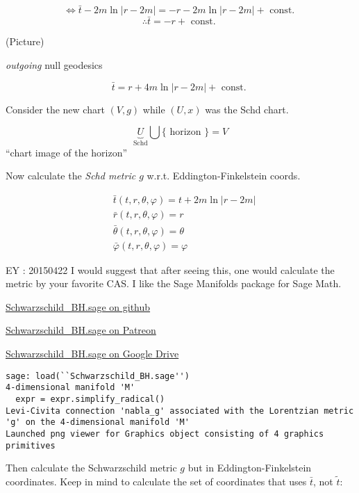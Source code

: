 \documentclass[10pt, twoside]{amsart}
\begin{document}
\begin{multicols*}{2}
\[
\Longleftrightarrow \bar{t} - 2m \ln{ |r-2m |} = -r - 2m \ln{ |r-2m |} + \text{ const. }
\]
\[
\therefore \bar{t} = -r + \text{ const. }
\]

(Picture)

\emph{outgoing} null geodesics

\[
\bar{t} = r + 4 m \ln{ |r - 2m| } + \text{ const. }
\]

Consider the new chart $(V,g)$ while $(U,x)$ was the Schd chart.

\[
\underbrace{U}_{\text{Schd}} \bigcup \lbrace \text{ horizon } \rbrace = V
\]
``chart image of the horizon''

Now calculate the \emph{Schd metric $g$ } w.r.t. Eddington-Finkelstein coords.

\[
\begin{aligned}
  & \bar{t}(t,r,\theta,\varphi) = t + 2m\ln{ |r -2m | } \\
  & \bar{r}(t,r,\theta,\varphi) = r \\
  & \bar{\theta}(t,r,\theta,\varphi) = \theta \\
  & \bar{\varphi}(t,r,\theta,\varphi) = \varphi
\end{aligned}
\]

EY : 20150422 I would suggest that after seeing this, one would calculate the metric by your favorite CAS.  I like the Sage Manifolds package for Sage Math.  

\href{https://github.com/ernestyalumni/diffgeo-by-sagemnfd/blob/master/Schwarzschild_BH.sage}{Schwarzschild\_BH.sage on github}

\href{https://www.patreon.com/file?s=645287&h=2254352&i=108637}{Schwarzschild\_BH.sage on Patreon}

\href{https://drive.google.com/file/d/0B1H1Ygkr4EWJdllTR3czQU9DeW8/view?usp=sharing}{Schwarzschild\_BH.sage on Google Drive}

\begin{lstlisting}[frame=single]
sage: load(``Schwarzschild_BH.sage'')
4-dimensional manifold 'M'
  expr = expr.simplify_radical()
Levi-Civita connection 'nabla_g' associated with the Lorentzian metric 'g' on the 4-dimensional manifold 'M'
Launched png viewer for Graphics object consisting of 4 graphics primitives
\end{lstlisting}

Then calculate the Schwarzschild metric $g$ but in Eddington-Finkelstein coordinates.  Keep in mind to calculate the set of coordinates that uses $\bar{t}$, not $\widetilde{t}$: 


\end{multicols*}
\end{document}
